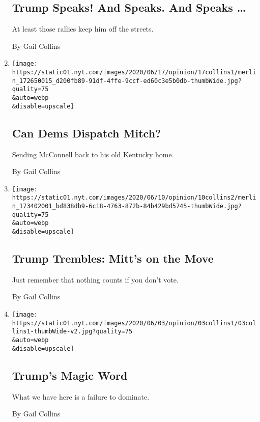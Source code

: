 \begin{enumerate}
{  \subsection{Trump Speaks! And Speaks. And Speaks
  \ldots{}}\label{trump-speaks-and-speaks-and-speaks-}}

  At least those rallies keep him off the streets.

  By Gail Collins
\item
  \href{/2020/06/17/opinion/mitch-mcconnell-kentucky-senate.html}{}

  \texttt{[image: https://static01.nyt.com/images/2020/06/17/opinion/17collins1/merlin\_172650015\_d200fb89-91df-4ffe-9ccf-ed60c3e5b0db-thumbWide.jpg?quality=75\\\&auto=webp\\\&disable=upscale]}

  \hypertarget{can-dems-dispatch-mitch}{%
  \subsection{Can Dems Dispatch Mitch?}\label{can-dems-dispatch-mitch}}

  Sending McConnell back to his old Kentucky home.

  By Gail Collins
\item
  \href{/2020/06/10/opinion/trump-romney-murkowski.html}{}

  \texttt{[image: https://static01.nyt.com/images/2020/06/10/opinion/10collins2/merlin\_173402001\_bd838db9-6c18-4763-872b-84b429bd5745-thumbWide.jpg?quality=75\\\&auto=webp\\\&disable=upscale]}

  \hypertarget{trump-trembles-mitts-on-the-move}{%
  \subsection{Trump Trembles: Mitt's on the
  Move}\label{trump-trembles-mitts-on-the-move}}

  Just remember that nothing counts if you don't vote.

  By Gail Collins
\item
  \href{/2020/06/03/opinion/trump-dominate.html}{}

  \texttt{[image: https://static01.nyt.com/images/2020/06/03/opinion/03collins1/03collins1-thumbWide-v2.jpg?quality=75\\\&auto=webp\\\&disable=upscale]}

  \hypertarget{trumps-magic-word}{%
  \subsection{Trump's Magic Word}\label{trumps-magic-word}}

  What we have here is a failure to dominate.

  By Gail Collins
\end{enumerate}

